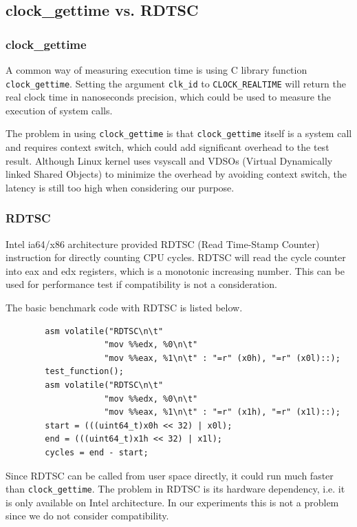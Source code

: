 \documentclass{article}
\begin{document}
\subsection{clock\_gettime vs. RDTSC}

\subsubsection{clock\_gettime}

A common way of measuring execution time is using C library function \lstinline{clock_gettime}.
Setting the argument \lstinline{clk_id} to \lstinline{CLOCK_REALTIME} will return the real clock time in nanoseconds precision,
which could be used to measure the execution of system calls.

The problem in using \lstinline{clock_gettime} is that \lstinline{clock_gettime} itself is a system call
and requires context switch, which could add significant overhead to the test result.
Although Linux kernel uses vsyscall and VDSOs (Virtual Dynamically linked Shared Objects) to minimize
the overhead by avoiding context switch, the latency is still too high when considering our purpose.

\subsubsection{RDTSC}

Intel ia64/x86 architecture provided RDTSC (Read Time-Stamp Counter) instruction\cite{rdtsc} for directly counting CPU cycles. 
RDTSC will read the cycle counter into eax and edx registers, which is a monotonic increasing number.
This can be used for performance test if compatibility is not a consideration.

The basic benchmark code with RDTSC is listed below.

\begin{verbatim}
        asm volatile("RDTSC\n\t"
                    "mov %%edx, %0\n\t"
                    "mov %%eax, %1\n\t" : "=r" (x0h), "=r" (x0l)::);
        test_function();
        asm volatile("RDTSC\n\t"
                    "mov %%edx, %0\n\t"
                    "mov %%eax, %1\n\t" : "=r" (x1h), "=r" (x1l)::);
        start = (((uint64_t)x0h << 32) | x0l);
        end = (((uint64_t)x1h << 32) | x1l);
        cycles = end - start;
\end{verbatim}

Since RDTSC can be called from user space directly, it could run much faster than \lstinline{clock_gettime}.
The problem in RDTSC is its hardware dependency, i.e. it is only available on Intel architecture.
In our experiments this is not a problem since we do not consider compatibility.
\end{document}
